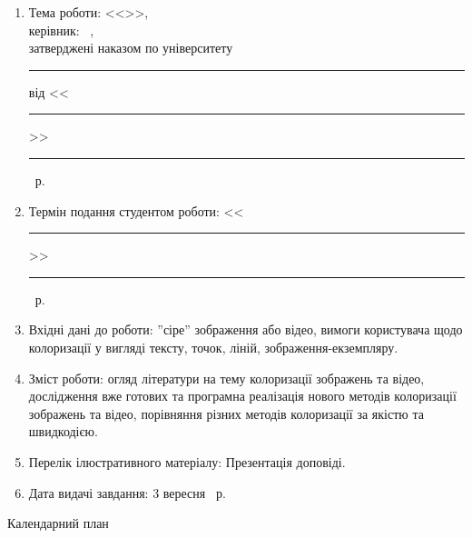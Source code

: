 \begin{enumerate}[label=\arabic*.]
    \item 
        Тема роботи: <<\emph{\reportTitle}>>, \\
        керівник: \supervisorRegalia ~\supervisorPibFShort, \\
        затверджені наказом по університету \textnumero \rule{0.5cm}{0.25pt} від <<\rule{0.5cm}{0.25pt}>> \rule{2.5cm}{0.25pt} \YearOfDefence~р.

    \item 
        Термін подання студентом роботи: <<\rule{0.5cm}{0.25pt}>> \rule{2.5cm}{0.25pt} \YearOfDefence~р.

    \item 
        Вхідні дані до роботи: ''сіре'' зображення або відео, вимоги користувача щодо колоризації у вигляді тексту, точок, ліній, зображення-екземпляру.

    \item
        Зміст роботи: огляд літератури на тему колоризації зображень та відео, дослідження вже готових та програмна реалізація нового методів колоризації зображень та відео, порівняння різних методів колоризації за якістю та швидкодією.

    \item 
        Перелік ілюстративного матеріалу: Презентація доповіді.

    \item
        Дата видачі завдання: 3 вересня \YearOfBeginning~р.
\end{enumerate}


\newpage
\thispagestyle{empty}

\begin{center}
    Календарний план
\end{center}

